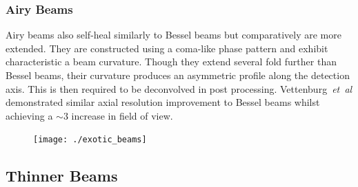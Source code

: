 \subsubsection{Airy Beams}
Airy beams also self-heal similarly to Bessel beams but comparatively are more extended.
They are constructed using a coma-like phase pattern and exhibit characteristic a beam curvature.
Though they extend several fold further than Bessel beams, their curvature produces an asymmetric profile along the detection axis.
This is then required to be deconvolved in post processing.
Vettenburg~\emph{et~al}\cite{vettenburg_light-sheet_2014} demonstrated similar axial resolution improvement to Bessel beams whilst achieving a $\sim 3$ increase in field of view.

\begin{figure}
	\centering
	\label{fig:scatteringandshadowing}
	\texttt{[image: ./exotic\_beams]}
    \caption{}
\end{figure}
\subsection{Thinner Beams}

